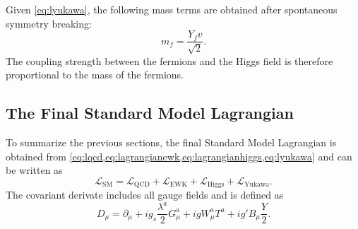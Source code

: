 
Given \cref{eq:lyukawa}, the following mass terms are obtained after spontaneous symmetry breaking:
\begin{equation}
  m_f = \frac{Y_f v}{\sqrt{2}}.
\end{equation}
The coupling strength between the fermions and the Higgs field is therefore proportional to the mass of the fermions.


\subsection{The Final Standard Model Lagrangian}
To summarize the previous sections, the final Standard Model Lagrangian is obtained from \cref{eq:lqcd,eq:lagrangianewk,eq:lagrangianhiggs,eq:lyukawa} and can be written as
\begin{equation}
  \mathcal{L}_\text{SM} = \mathcal{L}_\text{QCD} + \mathcal{L}_\text{EWK} + \mathcal{L}_\text{Higgs} + \mathcal{L}_\text{Yukawa}.
\end{equation}
The covariant derivate includes all gauge fields and is defined as
\begin{equation}
  D_\mu = \partial_\mu + i g_s \frac{\lambda^a}{2} G_\mu^a + igW_\mu^aT^a + ig'B_\mu \frac{Y}{2}.
\end{equation}



